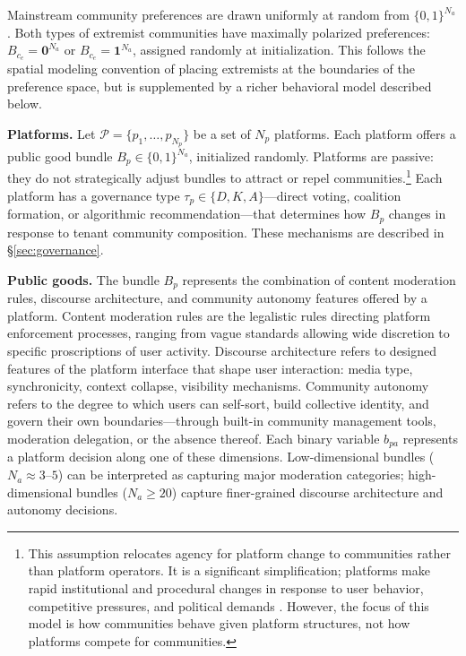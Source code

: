 \documentclass[12pt]{article}
\begin{document}
Mainstream community preferences are drawn uniformly at random from $\{0,1\}^{N_a}$. Both types of extremist communities have maximally polarized preferences: $B_{c_e} = \mathbf{0}^{N_a}$ or $B_{c_e} = \mathbf{1}^{N_a}$, assigned randomly at initialization. This follows the spatial modeling convention of placing extremists at the boundaries of the preference space, but is supplemented by a richer behavioral model described below.

\textbf{Platforms.} Let $\mathcal{P} = \{p_1, \ldots, p_{N_p}\}$ be a set of $N_p$ platforms. Each platform offers a public good bundle $B_p \in \{0,1\}^{N_a}$, initialized randomly. Platforms are passive: they do not strategically adjust bundles to attract or repel communities.\footnote{This assumption relocates agency for platform change to communities rather than platform operators. It is a significant simplification; platforms make rapid institutional and procedural changes in response to user behavior, competitive pressures, and political demands \citep{klonick2017new}. However, the focus of this model is how communities behave given platform structures, not how platforms compete for communities.} Each platform has a governance type $\tau_p \in \{D, K, A\}$---direct voting, coalition formation, or algorithmic recommendation---that determines how $B_p$ changes in response to tenant community composition. These mechanisms are described in \S\ref{sec:governance}.

\textbf{Public goods.} The bundle $B_p$ represents the combination of content moderation rules, discourse architecture, and community autonomy features offered by a platform. Content moderation rules are the legalistic rules directing platform enforcement processes, ranging from vague standards allowing wide discretion to specific proscriptions of user activity. Discourse architecture refers to designed features of the platform interface that shape user interaction: media type, synchronicity, context collapse, visibility mechanisms. Community autonomy refers to the degree to which users can self-sort, build collective identity, and govern their own boundaries---through built-in community management tools, moderation delegation, or the absence thereof. Each binary variable $b_{pa}$ represents a platform decision along one of these dimensions. Low-dimensional bundles ($N_a \approx 3$--$5$) can be interpreted as capturing major moderation categories; high-dimensional bundles ($N_a \geq 20$) capture finer-grained discourse architecture and autonomy decisions.
\end{document}
